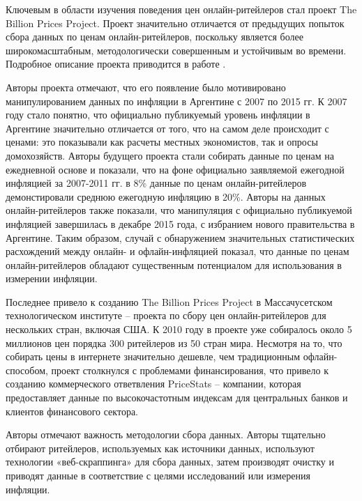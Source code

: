 Ключевым в области изучения поведения цен онлайн-ритейлеров стал проект The Billion Prices Project. Проект значительно отличается от предыдущих попыток сбора данных по ценам онлайн-ритейлеров, поскольку является более широкомасштабным, методологически совершенным и устойчивым во времени. Подробное описание проекта приводится в работе \cite{cavallo2016billion}.

Авторы проекта отмечают, что его появление было мотивировано манипулированием данных по инфляции в Аргентине с 2007 по 2015 гг. К 2007 году стало понятно, что официально публикуемый уровень инфляции в Аргентине значительно отличается от того, что на самом деле происходит с ценами: это показывали как расчеты местных экономистов, так и опросы домохозяйств. Авторы будущего проекта стали собирать данные по ценам на ежедневной основе и показали, что на фоне официально заявляемой ежегодной инфляцией за 2007-2011 гг. в 8\% данные по ценам онлайн-ритейлеров демонстировали среднюю ежегодную инфляцию в 20\%. Авторы на данных онлайн-ритейлеров также показали, что манипуляция с официально публикуемой инфляцией завершилась в декабре 2015 года, с избранием нового правительства в Аргентине. Таким образом, случай с обнаружением значительных статистических расхождений между онлайн- и офлайн-инфляцией показал, что данные по ценам онлайн-ритейлеров обладают существенным потенциалом для использования в измерении инфляции.

Последнее привело к созданию The Billion Prices Project в Массачусетском технологическом институте – проекта по сбору цен онлайн-ритейлеров для нескольких стран, включая США. К 2010 году в проекте уже собиралось около 5 миллионов цен порядка 300 ритейлеров из 50 стран мира. Несмотря на то, что собирать цены в интернете значительно дешевле, чем традиционным офлайн-способом, проект столкнулся с проблемами финансирования, что привело к созданию коммерческого ответвления PriceStats – компании, которая предоставляет данные по высокочастотным индексам для центральных банков и клиентов финансового сектора.

Авторы отмечают важность методологии сбора данных. Авторы тщательно отбирают ритейлеров, используемых как источники данных, используют технологии «веб-скраппинга» для сбора данных, затем производят очистку и приводят данные в соответствие с целями исследований или измерения инфляции. 

